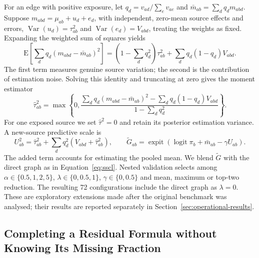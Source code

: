 \documentclass[applsci,article,submit,oneauthor]{Definitions/mdpi}
\newcommand{\logit}{\operatorname{logit}}
\newcommand{\expit}{\operatorname{expit}}
\begin{document}
For an edge with positive exposure, let $q_d=v_{ad}/\sum_e v_{ae}$ and $\bar m_{ab}=\sum_d q_dm_{abd}$. Suppose $m_{abd}=\mu_{ab}+u_d+e_d$, with independent, zero-mean source effects and errors, $\operatorname{Var}(u_d)=\tau_{ab}^2$ and $\operatorname{Var}(e_d)=V_{abd}$, treating the weights as fixed. Expanding the weighted sum of squares yields
\begin{equation}
\mathrm E\!\left[\sum_dq_d(m_{abd}-\bar m_{ab})^2\right]
=\left(1-\sum_dq_d^2\right)\tau_{ab}^2+\sum_dq_d(1-q_d)V_{abd}.
\label{eq:variance-decomposition}
\end{equation}
The first term measures genuine source variation; the second is the contribution of estimation noise. Solving this identity and truncating at zero gives the moment estimator
\begin{equation}
\widehat\tau_{ab}^2=
\max\!\left\{0,\frac{\sum_dq_d(m_{abd}-\bar m_{ab})^2-\sum_dq_d(1-q_d)V_{abd}}
{1-\sum_dq_d^2}\right\}.
\label{eq:tau-estimator}
\end{equation}
For one exposed source we set $\widehat\tau^2=0$ and retain its posterior estimation variance. A new-source predictive scale is
\begin{equation}
U_{ab}^2=\widehat\tau_{ab}^2+\sum_dq_d^2(V_{abd}+\widehat\tau_{ab}^2),\qquad
\widetilde G_{ab}=\expit(\logit\pi_b+\bar m_{ab}-\gamma U_{ab}).
\label{eq:posterior-edge}
\end{equation}
The added term accounts for estimating the pooled mean. We blend $\widetilde G$ with the direct graph as in Equation~\eqref{eq:sscl}. Nested validation selects among $\alpha\in\{0.5,1,2,5\}$, $\lambda\in\{0,0.5,1\}$, $\gamma\in\{0,0.5\}$ and mean, maximum or top-two reduction. The resulting 72 configurations include the direct graph as $\lambda=0$. These are exploratory extensions made after the original benchmark was analysed; their results are reported separately in Section~\ref{sec:operational-results}.

\subsection{Completing a Residual Formula without Knowing Its Missing Fraction}
\label{sec:operational}
\end{document}
